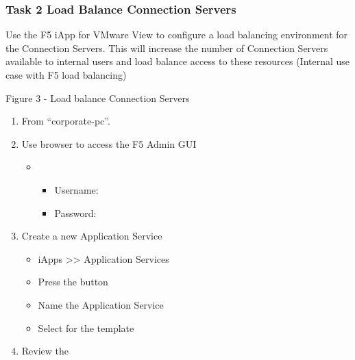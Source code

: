 \documentclass[letterpaper,10pt,english]{sphinxmanual}
\begin{document}
\subsubsection{Task 2 \textendash{} Load Balance Connection Servers}
\label{\detokenize{class2/module1/lab1:task-2-load-balance-connection-servers}}
Use the F5 iApp for VMware View to configure a load balancing
environment for the Connection Servers. This will increase the number of
Connection Servers available to internal users and load balance access
to these resources (Internal use case with F5 load balancing)


Figure 3 - Load balance Connection Servers

\begin{enumerate}
\item {} 
From “corporate-pc”.

\item {} 
Use browser to access the F5 Admin GUI
\begin{itemize}
\item {} 
\begin{itemize}
\item {} 
Username: 

\item {} 
Password: 

\end{itemize}

\end{itemize}

\item {} 
Create a new Application Service
\begin{itemize}
\item {} 
iApps \textgreater{}\textgreater{} Application Services

\item {} 
Press the  button

\item {} 
Name the Application Service 

\item {} 
Select  for the template

\end{itemize}

\item {} 
Review the 


\end{enumerate}
\end{document}
